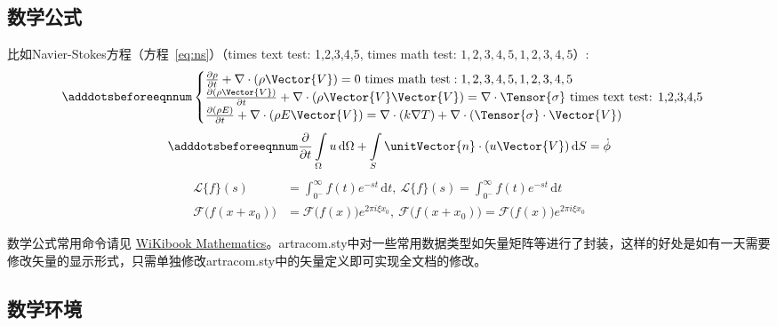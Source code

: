 \subsection{数学公式}

比如Navier-Stokes方程（方程~\eqref{eq:ns}）（times text test: 1,2,3,4,5, times math test: $\mathrm{1,2,3,4,5}, 1,2,3,4,5$）:
\begin{equation} \label{eq:ns}
    \adddotsbeforeeqnnum%
    \begin{cases}
        \frac{\partial \rho}{\partial t} + \nabla\cdot(\rho\Vector{V}) = 0 \ \mathrm{times\ math\ test: 1,2,3,4,5}, 1,2,3,4,5\\
        \frac{\partial (\rho\Vector{V})}{\partial t} + \nabla\cdot(\rho\Vector{V}\Vector{V}) = \nabla\cdot\Tensor{\sigma} \ \text{times text test: 1,2,3,4,5}\\
        \frac{\partial (\rho E)}{\partial t} + \nabla\cdot(\rho E\Vector{V}) = \nabla\cdot(k\nabla T) + \nabla\cdot(\Tensor{\sigma}\cdot\Vector{V})
    \end{cases}
\end{equation}
\begin{equation}
    \adddotsbeforeeqnnum%
    \frac{\partial }{\partial t}\int\limits_{\Omega} u \, \mathrm{d}\Omega + \int\limits_{S} \unitVector{n}\cdot(u\Vector{V}) \, \mathrm{d}S = \dot{\phi}
\end{equation}
\[
    \begin{split}
        \mathcal{L} \{f\}(s) &= \int _{0^{-}}^{\infty} f(t) e^{-st} \, \mathrm{d}t, \ 
        \mathscr{L} \{f\}(s) = \int _{0^{-}}^{\infty} f(t) e^{-st} \, \mathrm{d}t\\
        \mathcal{F} {\bigl (} f(x+x_{0}) {\bigr )} &= \mathcal{F} {\bigl (} f(x) {\bigr )} e^{2\pi i\xi x_{0}}, \ 
        \mathscr{F} {\bigl (} f(x+x_{0}) {\bigr )} = \mathscr{F} {\bigl (} f(x) {\bigr )} e^{2\pi i\xi x_{0}}
    \end{split}
\]

数学公式常用命令请见 \href{https://en.wikibooks.org/wiki/LaTeX/Mathematics}{WiKibook Mathematics}。artracom.sty中对一些常用数据类型如矢量矩阵等进行了封装，这样的好处是如有一天需要修改矢量的显示形式，只需单独修改artracom.sty中的矢量定义即可实现全文档的修改。

\subsection{数学环境}

